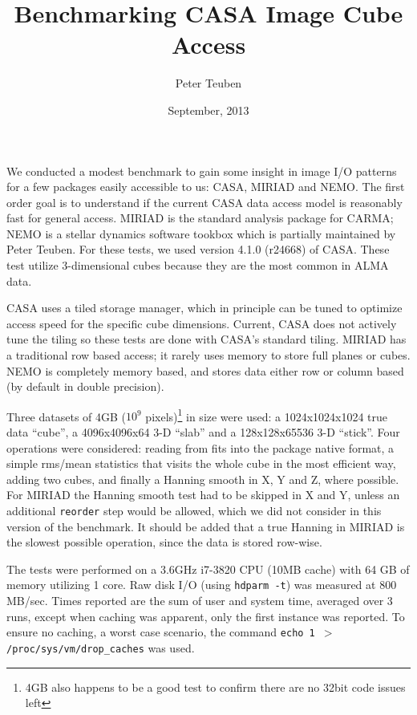 \documentclass{article}
\title{Benchmarking CASA Image Cube Access}
\author{Peter Teuben}
\date{September, 2013}
\begin{document}
\maketitle


We conducted a modest benchmark to gain some insight in image
I/O patterns for a few packages easily accessible to us: CASA,
MIRIAD and NEMO. The first order goal is to understand if the
current CASA data access model is reasonably fast for general
access.
MIRIAD is the standard analysis package for
CARMA; NEMO is a stellar dynamics software tookbox which is
partially maintained by Peter Teuben. For these tests, we
used version 4.1.0 (r24668) of CASA. These test utilize 3-dimensional cubes
because they are the most common in ALMA data.

CASA uses a tiled storage manager, which in principle
can be tuned to optimize access speed for the specific
cube dimensions.  Current, CASA does not actively tune
the tiling so these tests are done with CASA's standard tiling.
MIRIAD has a traditional row based access; it rarely
uses memory to store full planes or cubes. NEMO is completely
memory based, and stores data either row or column based
(by default in double precision).

Three datasets of 4GB ($10^9$ pixels)\footnote{4GB also happens to
be a good test to confirm there are no 32bit code issues left}
in size were used:
a 1024x1024x1024 true data ``cube'',
a 4096x4096x64 3-D ``slab'' and a 128x128x65536 3-D ``stick''.
Four operations were considered:  reading from fits
into the package native format,
a simple rms/mean statistics that visits the whole cube in the
most efficient way, adding two cubes, and finally
a Hanning smooth in X, Y and Z, where possible.  For MIRIAD
the Hanning smooth test had to be skipped in X and Y, unless
an additional {\tt reorder} step would be allowed, which we did
not consider in this version of the benchmark.
It should be added that a true Hanning in MIRIAD
is the slowest possible operation, since the data is stored
row-wise.

The tests were performed on a 3.6GHz i7-3820 CPU (10MB cache) with 64 GB of memory 
utilizing 1 core.  Raw disk I/O (using {\tt hdparm -t}) was measured at
800 MB/sec. Times reported are the sum of user and system time, averaged
over 3 runs, except when caching was apparent, only the first instance 
was reported. To ensure no caching, a worst case scenario, the command
{\tt echo 1 $>$ /proc/sys/vm/drop\_caches} was used.
\end{document}
